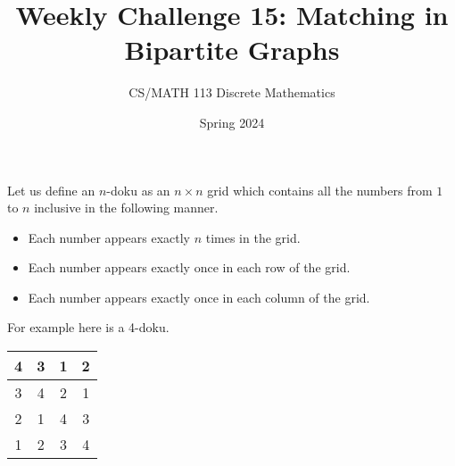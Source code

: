 \documentclass[a4paper,addpoints]{exam}
\title{Weekly Challenge 15: Matching in Bipartite Graphs}
\author{CS/MATH 113 Discrete Mathematics}
\date{Spring 2024}
\begin{document}
\maketitle

\begin{questions}
  Let us define an $n$-doku as an $n\times n$ grid which contains all the numbers from $1$ to $n$ inclusive in the following manner.
  \begin{itemize}
  \item Each number appears exactly $n$ times in the grid.
  \item Each number appears exactly once in each row of the grid.
  \item Each number appears exactly once in each column of the grid.
  \end{itemize}
  For example here is a 4-doku.
  
  \begin{center}
    \begin{tabular}{|c|c|c|c|} \hline 
      4&  3&  1& 2\\ \hline
      3&  4&  2& 1\\ \hline 
      2&  1&  4& 3\\ \hline 
      1&  2&  3& 4\\ \hline 
    \end{tabular}
  \end{center}
  
\end{questions}
\end{document}
